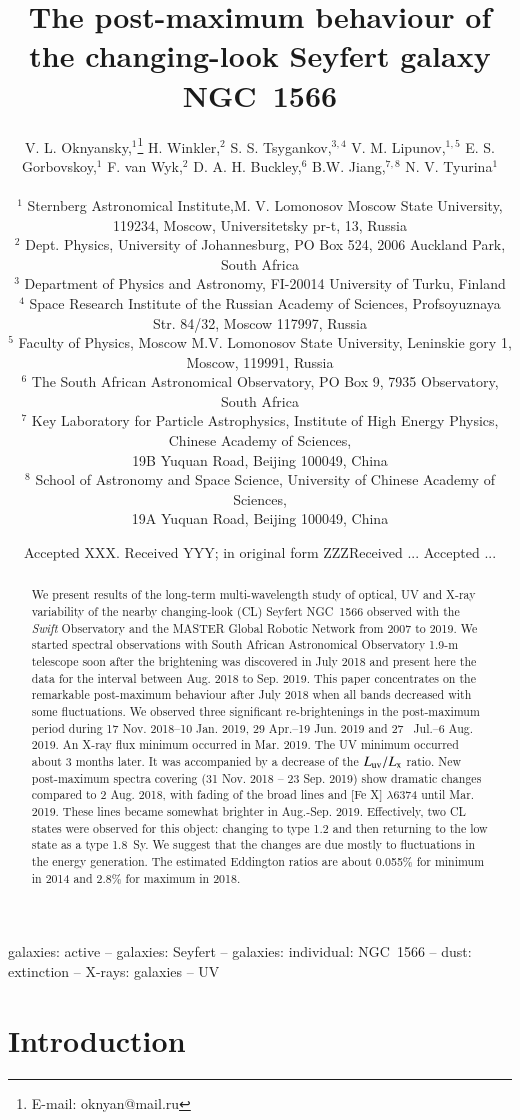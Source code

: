 \documentclass[fleqn,usenatbib]{mnras}
\title[The post-maximum behaviour of NGC~1566] {The  post-maximum behaviour of the changing-look Seyfert galaxy NGC~1566}
\author[V. L. Oknyansky et al.]{V. L. Oknyansky,$^{1}$\thanks{E-mail: oknyan@mail.ru}
H. Winkler,$^{2}$
S. S. Tsygankov,$^{3,4}$
V. M. Lipunov,$^{1,5}$
\newauthor E. S. Gorbovskoy,$^{1}$
F. van Wyk,$^{2}$
D. A. H. Buckley,$^{6}$
B.W. Jiang,$^{7,8}$
\newauthor N. V. Tyurina$^{1}$
\\
\\
$^{1}$ Sternberg Astronomical Institute,M. V. Lomonosov Moscow State University,  119234, Moscow, Universitetsky pr-t, 13, Russia\\
$^{2}$ Dept. Physics, University of Johannesburg, PO Box 524, 2006 Auckland Park, South Africa\\
$^{3}$ Department of Physics and Astronomy, FI-20014 University of Turku, Finland \\
$^{4}$ Space Research Institute of the Russian Academy of Sciences, Profsoyuznaya Str. 84/32, Moscow 117997, Russia \\
$^{5}$ Faculty of Physics, Moscow M.V. Lomonosov State University, Leninskie gory 1, Moscow, 119991, Russia\\
$^{6}$ The South African Astronomical Observatory, PO Box 9, 7935 Observatory, South Africa\\
$^{7}$ Key Laboratory for Particle Astrophysics, Institute of High Energy Physics, Chinese Academy of Sciences, \\ 19B Yuquan Road, Beijing 100049, China\\
$^{8}$ School of Astronomy and Space Science, University of Chinese Academy of Sciences, \\ 19A Yuquan Road, Beijing 100049, China
}
\date{Accepted XXX. Received YYY; in original form ZZZ}
\begin{document}
\date{Received ... Accepted ...}
\pagerange{\pageref{firstpage}--\pageref{lastpage}}
\maketitle{}

\label{firstpage}

\begin{abstract}
 We  present results of the long-term multi-wavelength study of optical, UV and X-ray variability of the nearby changing-look  (CL) Seyfert NGC~1566 observed with the {\it Swift} Observatory and the MASTER Global Robotic Network from 2007 to 2019. We started spectral observations with South African Astronomical Observatory 1.9-m telescope soon after the brightening was discovered in July 2018 and present here the data for the interval between Aug. 2018  to Sep. 2019. This paper concentrates on the remarkable post-maximum behaviour after July 2018 when all bands decreased with some fluctuations. We observed three significant re-brightenings in the post-maximum period  during 17 Nov. 2018--10 Jan. 2019, 29 Apr.--19 Jun. 2019 and 27~ Jul.--6 Aug. 2019. An X-ray flux minimum occurred in  Mar. 2019.  The UV minimum occurred about 3 months later.  It was accompanied by a decrease of the $L_{\rm uv}/L_{\rm x}$ ratio.  New post-maximum spectra covering (31 Nov. 2018 -- 23 Sep. 2019) show dramatic changes compared to 2 Aug. 2018, with fading of the broad lines and [Fe X] $\lambda$6374 until Mar. 2019.  These lines became somewhat brighter in Aug.-Sep. 2019. Effectively, two CL states were observed for this object: changing to type 1.2 and then returning to the low state  as a type 1.8~Sy. We suggest that the changes are due mostly to fluctuations in the energy generation. The estimated Eddington ratios are about 0.055$\%$ for minimum in 2014 and  2.8$\% $ for maximum in 2018.
\end{abstract}

\begin{keywords}
galaxies: active -- galaxies: Seyfert -- galaxies: individual: NGC~1566 -- dust: extinction --  X-rays: galaxies -- UV
\end{keywords}



\section{Introduction}
\end{document}
